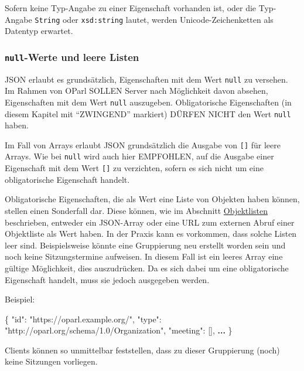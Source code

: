 \documentclass[,a4paper]{article}
\newenvironment{Shaded}{}{}
\newcommand{\DataTypeTok}[1]{\textcolor[rgb]{0.56,0.13,0.00}{{#1}}}
\newcommand{\StringTok}[1]{\textcolor[rgb]{0.25,0.44,0.63}{{#1}}}
\newcommand{\OtherTok}[1]{\textcolor[rgb]{0.00,0.44,0.13}{{#1}}}
\newcommand{\FunctionTok}[1]{\textcolor[rgb]{0.02,0.16,0.49}{{#1}}}
\newcommand{\ErrorTok}[1]{\textcolor[rgb]{1.00,0.00,0.00}{\textbf{{#1}}}}
\begin{document}
Sofern keine Typ-Angabe zu einer Eigenschaft vorhanden ist, oder die
Typ-Angabe \texttt{String} oder \texttt{xsd:string} lautet, werden
Unicode-Zeichenketten als Datentyp erwartet.

\subsubsection{\texttt{null}-Werte und leere
Listen}\label{null-werte-und-leere-listen}

JSON erlaubt es grundsätzlich, Eigenschaften mit dem Wert \texttt{null}
zu versehen. Im Rahmen von OParl SOLLEN Server nach Möglichkeit davon
absehen, Eigenschaften mit dem Wert \texttt{null} auszugeben.
Obligatorische Eigenschaften (in diesem Kapitel mit ``ZWINGEND''
markiert) DÜRFEN NICHT den Wert \texttt{null} haben.

Im Fall von Arrays erlaubt JSON grundsätzlich die Ausgabe von
\texttt{{[}{]}} für leere Arrays. Wie bei \texttt{null} wird auch hier
EMPFOHLEN, auf die Ausgabe einer Eigenschaft mit dem Wert
\texttt{{[}{]}} zu verzichten, sofern es sich nicht um eine
obligatorische Eigenschaft handelt.

Obligatorische Eigenschaften, die als Wert eine Liste von Objekten haben
können, stellen einen Sonderfall dar. Diese können, wie im Abschnitt
\hyperref[objektlisten]{Objektlisten} beschrieben, entweder ein
JSON-Array oder eine URL zum externen Abruf einer Objektliste als Wert
haben. In der Praxis kann es vorkommen, dass solche Listen leer sind.
Beispielsweise könnte eine Gruppierung neu erstellt worden sein und noch
keine Sitzungstermine aufweisen. In diesem Fall ist ein leeres Array
eine gültige Möglichkeit, dies auszudrücken. Da es sich dabei um eine
obligatorische Eigenschaft handelt, muss sie jedoch ausgegeben werden.

Beispiel:

\begin{Shaded}
\begin{Highlighting}[]
\FunctionTok{\{}
    \DataTypeTok{"id"}\FunctionTok{:} \StringTok{"https://oparl.example.org/"}\FunctionTok{,}
    \DataTypeTok{"type"}\FunctionTok{:} \StringTok{"http://oparl.org/schema/1.0/Organization"}\FunctionTok{,}
    \DataTypeTok{"meeting"}\FunctionTok{:} \OtherTok{[]}\FunctionTok{,}
    \ErrorTok{...}
\FunctionTok{\}}
\end{Highlighting}
\end{Shaded}

Clients können so unmittelbar feststellen, dass zu dieser Gruppierung
(noch) keine Sitzungen vorliegen.
\end{document}
